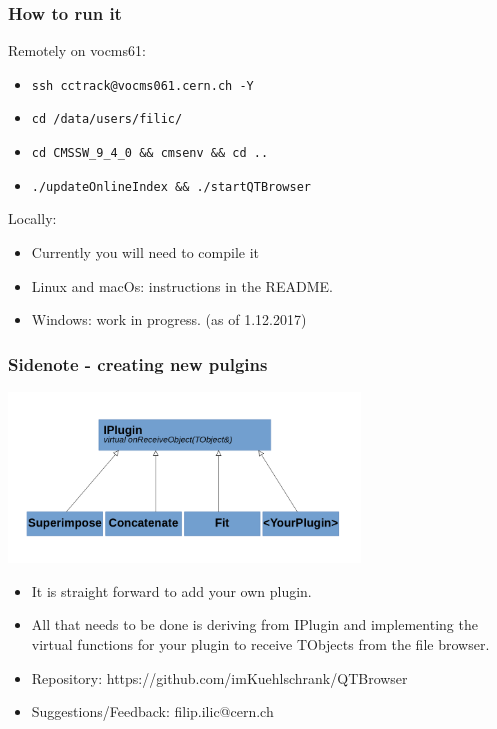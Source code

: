\documentclass{beamer}
\begin{document}
\begin{frame}
\frametitle{How to run it}
Remotely on vocms61:
\begin{itemize}
\item \texttt{ssh cctrack@vocms061.cern.ch -Y}
\item \texttt{cd /data/users/filic/}
\item \texttt{cd CMSSW\_9\_4\_0 \&\& cmsenv \&\& cd ..}
\item \texttt{./updateOnlineIndex \&\& ./startQTBrowser}
\end{itemize}
Locally:
\begin{itemize}
\item Currently you will need to compile it
\item Linux and macOs: instructions in the README.
\item Windows: work in progress. (as of 1.12.2017)
\end{itemize}

\end{frame}

\begin{frame}
\frametitle{Sidenote - creating new pulgins}
 \includegraphics[width=0.7\textwidth]{figures/iplugin_uml.png}
 \begin{itemize}
 \item It is straight forward to add your own plugin.
 \item All that needs to be done is deriving from IPlugin and implementing the virtual functions
 for your plugin to receive TObjects from the file browser.
 \end{itemize}
\end{frame}

\begin{frame}
\begin{itemize}
\item Repository: https://github.com/imKuehlschrank/QTBrowser
\item Suggestions/Feedback: filip.ilic@cern.ch
\end{itemize}
\end{frame}
\end{document}
